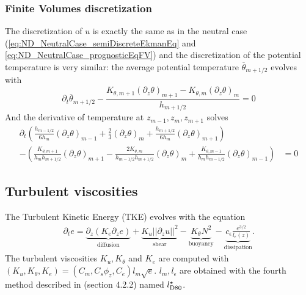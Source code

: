 \subsubsection{Finite Volumes discretization}
The discretization of $u$ is exactly the same as in the
neutral case (\eqref{eq:ND_NeutralCase_semiDiscreteEkmanEq} and \eqref{eq:ND_NeutralCase_prognosticEqFV}) and the discretization of 
the potential temperature is very similar:
the average potential temperature $\overline{\theta}_{m+1/2}$
evolves with
\begin{equation}
\label{eq:ND_StratifiedCase_semiDiscreteEkmanEqPT}
    \partial_t \overline{\theta}_{m+1/2}
    - \frac{K_{\theta, m+1} {(\partial_z \theta)}_{m+1} - K_{\theta, m} {(\partial_z \theta)}_m}{h_{m+1/2}}
    = 0
\end{equation}
And the derivative of temperature at $z_{m-1}, z_m, z_{m+1}$ solves
\begin{equation}
\begin{aligned}
\label{eq:ND_StratifiedCase_prognosticPT_FV}
\partial_t \left( \frac{h_{m-1/2}}{6h_m} {(\partial_z \theta)}_{m-1} 
+ \frac{2}{3} {(\partial_z \theta)}_m  
+ \frac{h_{m+1/2}}{6h_m} {(\partial_z \theta)}_{m+1} \right)& \\
-
    \left(
	\frac{K_{\theta, m+1}}{h_m h_{m+1/2}}{(\partial_z \theta)}_{m+1} - \frac{2 K_{\theta, m}}{h_{m-1/2} h _{m+1/2}}{(\partial_z \theta)}_m + \frac{K_{\theta, m-1}}{h_m h_{m-1/2}}{(\partial_z \theta)}_{m-1}
    \right)
&= 0
\end{aligned}
\end{equation}
\subsection{Turbulent viscosities}
\label{sec:ND_StratifiedCase_turbulentVisc}
The Turbulent Kinetic Energy (TKE) evolves with the equation
\begin{equation}
\label{eq:ND_StratifiedCase_TKE}
    \begin{aligned}
    \partial_t e =
    \underbrace{\partial_z \left(K_e
    \partial_z e\right)}_{\text{diffusion}}
    + \underbrace{K_u ||\partial_z u||^2}_{\text{shear}} 
    - \underbrace{K_{\theta} N^2 }_{\text{buoyancy}}
    - \underbrace{c_{\epsilon}
    \frac{e^{3/2}}{l_{\epsilon}(z)}}_{\text{dissipation}}.
    \end{aligned}
\end{equation}
The turbulent viscosities $K_u, K_{\theta}$ and $K_e$ are computed
with $(K_u, K_\theta, K_e) = (C_m , C_s \phi_z, C_e)l_m \sqrt{e}$.
$l_m, l_\epsilon$ are obtained with the fourth method described in \cite{lemarie2021gmd} (section 4.2.2) named $l^\star_{\rm D80}$.

